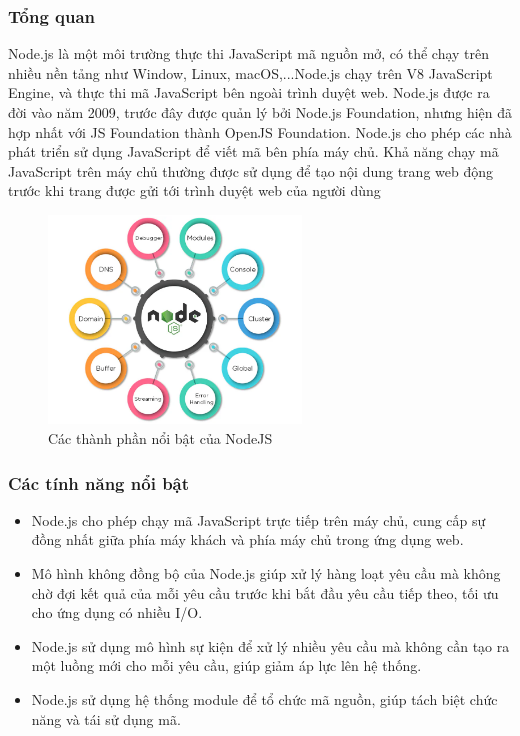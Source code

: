 \subsubsection{Tổng quan}
\hspace*{1cm} Node.js là một môi trường thực thi JavaScript mã nguồn mở, có thể chạy trên nhiều nền tảng như Window, Linux, macOS,...Node.js chạy trên V8 JavaScript Engine, và thực thi mã JavaScript bên ngoài trình duyệt web. Node.js được ra đời vào năm 2009, trước đây được quản lý bởi Node.js Foundation, nhưng hiện đã hợp nhất với JS Foundation thành OpenJS Foundation. Node.js cho phép các nhà phát triển sử dụng JavaScript để viết mã bên phía máy chủ. Khả năng chạy mã JavaScript trên máy chủ thường được sử dụng để tạo nội dung trang web động trước khi trang được gửi tới trình duyệt web của người dùng \cite{nodejs}
\begin{figure}[H]
    \centering
    \includegraphics[width=0.6\textwidth]{Images/technology/nodejs-structure.png}
    \caption{Các thành phần nổi bật của NodeJS}
\end{figure}
\subsubsection{Các tính năng nổi bật}
\begin{itemize}
    \item Node.js cho phép chạy mã JavaScript trực tiếp trên máy chủ, cung cấp sự đồng nhất giữa phía máy khách và phía máy chủ trong ứng dụng web.
    \item Mô hình không đồng bộ của Node.js giúp xử lý hàng loạt yêu cầu mà không chờ đợi kết quả của mỗi yêu cầu trước khi bắt đầu yêu cầu tiếp theo, tối ưu cho ứng dụng có nhiều I/O.
    \item Node.js sử dụng mô hình sự kiện để xử lý nhiều yêu cầu mà không cần tạo ra một luồng mới cho mỗi yêu cầu, giúp giảm áp lực lên hệ thống.
    \item Node.js sử dụng hệ thống module để tổ chức mã nguồn, giúp tách biệt chức năng và tái sử dụng mã.
\end{itemize}
